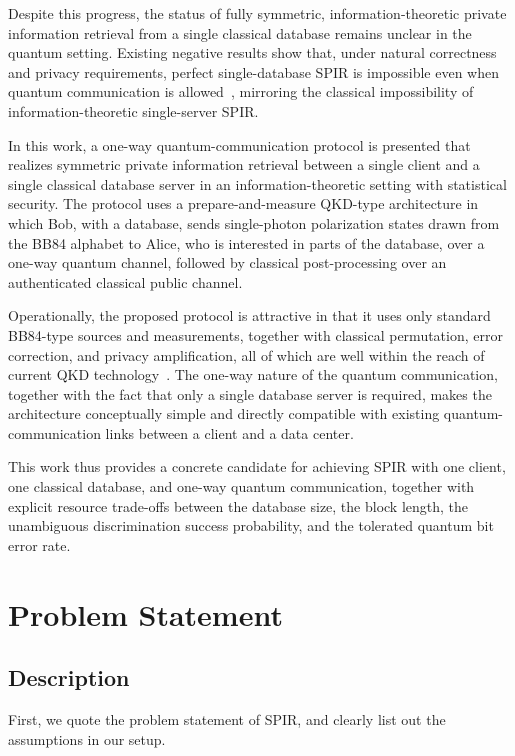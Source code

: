 \documentclass[%
 reprint,
superscriptaddress,
 amsmath,amssymb,
 aps,
]{revtex4-2}
\begin{document}
Despite this progress, the status of fully symmetric, information-theoretic private information retrieval from a single classical database remains unclear in the quantum setting. Existing negative results show that, under natural correctness and privacy requirements, perfect single-database SPIR is impossible even when quantum communication is allowed~\cite{Insecurity_Quantum_Oblivious_transfer1}, mirroring the classical impossibility of information-theoretic single-server SPIR.

In this work, a one-way quantum-communication protocol is presented that realizes symmetric private information retrieval between a single client and a single classical database server in an information-theoretic setting with statistical security.
The protocol uses a prepare-and-measure QKD-type architecture in which Bob, with a database, sends single-photon polarization states drawn from the BB84 alphabet to Alice, who is interested in parts of the database, over a one-way quantum channel, followed by classical post-processing over an authenticated classical public channel.

Operationally, the proposed protocol is attractive in that it uses only standard BB84-type sources and measurements, together with classical permutation, error correction, and privacy amplification, all of which are well within the reach of current QKD technology~\cite{Experimental_QKD1}. The one-way nature of the quantum communication, together with the fact that only a single database server is required, makes the architecture conceptually simple and directly compatible with existing quantum-communication links between a client and a data center.

This work thus provides a concrete candidate for achieving SPIR with one client, one classical database, and one-way quantum communication, together with explicit resource trade-offs between the database size, the block length, the unambiguous discrimination success probability, and the tolerated quantum bit error rate.


\section{Problem Statement}
\subsection{Description}

First, we quote the problem statement of SPIR, and clearly list out the assumptions in our setup.
\end{document}
